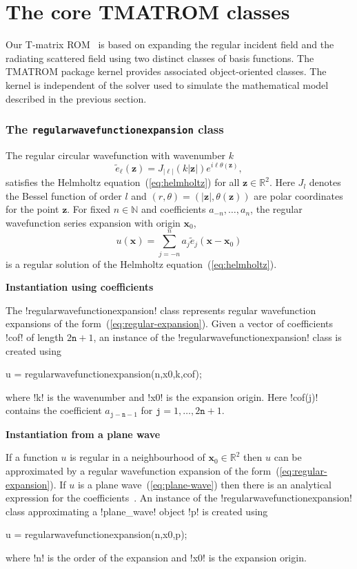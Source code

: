 \documentclass[12pt,letterpaper,final]{article}
\newcommand{\x}{\boldsymbol{x}}
\newcommand{\z}{\boldsymbol{z}}
\newcommand{\bbR}{\mathbb{R}}
\newcommand{\bbN}{\mathbb{N}}
\newcommand{\et}{\widetilde{e}}
\newcommand{\techheading}[1]{%
    \par\vspace{-0.3\parskip}\noindent\hspace{-1cm}\textbf{#1}%
    \par\vspace{-0.5\parskip}\noindent\nopagebreak\ignorespaces}
\begin{document}
\part{The core TMATROM classes}
\label{part:core}

Our T-matrix ROM~\cite{ghh:tmatrix} is based on expanding the regular incident 
field and the radiating scattered field using two distinct classes of basis functions. The
TMATROM package kernel 
provides associated object-oriented classes. The kernel is independent of
the solver used to simulate the mathematical model described in the previous section. 
\section{The \texttt{regularwavefunctionexpansion} class}

The regular circular  wavefunction with wavenumber $k$
\begin{equation}
\label{eq:regular-wavefunction}
\et_{\ell}(\z) = J_{|\ell|}(k |\z|) e^{i \ell \theta(\z)},
\end{equation}
satisfies the Helmholtz equation~(\ref{eq:helmholtz}) for all
$\z \in \bbR^2$.
Here $J_l$ denotes the Bessel function of order $l$ and
$(r,\theta) = (|\z|,\theta(\z))$ are polar coordinates for the point $\z$.
For fixed $n \in \bbN$ and coefficients $a_{-n},\dots,a_n$, the 
regular wavefunction series expansion
with origin $\x_0$,
\begin{equation}
\label{eq:regular-expansion}
u(\x) = \sum_{j=-n}^n a_j \et_j(\x - \x_0)
\end{equation}
is a regular solution of the Helmholtz equation~(\ref{eq:helmholtz}).

\techheading{Instantiation using coefficients}
The !regularwavefunctionexpansion! class represents regular
wavefunction expansions of the form~(\ref{eq:regular-expansion}).
Given a vector of coefficients !cof! of length $2 \texttt{n}+1$, 
an instance of the
!regularwavefunctionexpansion! class is created using
\begin{matlab}
u = regularwavefunctionexpansion(n,x0,k,cof);
\end{matlab}
where !k! is the wavenumber and !x0! is the expansion origin.
Here !cof(j)! contains the coefficient $a_{\texttt{j} - \texttt{n} -1}$
for $\texttt{j} = 1,\dots,2\texttt{n} + 1$.


\techheading{Instantiation from a plane wave}
If a function $u$ is regular in a neighbourhood of  $\x_0 \in \bbR^2$
then $u$ can be approximated by a regular wavefunction expansion of
the form~(\ref{eq:regular-expansion}).
If $u$ is a plane wave~(\ref{eq:plane-wave}) 
then there is an analytical expression for the coefficients~\cite{ghh:tmatrix}.
An instance of the !regularwavefunctionexpansion! class approximating
a !plane_wave! object !p! is created using
\begin{matlab}
u = regularwavefunctionexpansion(n,x0,p);
\end{matlab}
where !n! is the order of the expansion and !x0! is the expansion origin.
\end{document}
